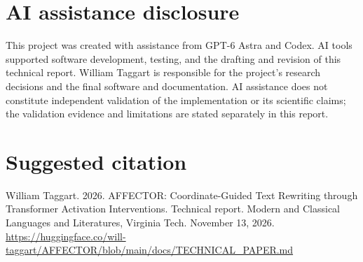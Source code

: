 \documentclass[manuscript,screen,nonacm]{acmart}
\begin{document}
\section*{AI assistance disclosure}
This project was created with assistance from GPT-6 Astra and Codex. AI
tools supported software development, testing, and the drafting and
revision of this technical report. William Taggart is responsible for
the project's research decisions and the final software and
documentation. AI assistance does not constitute independent validation
of the implementation or its scientific claims; the validation evidence
and limitations are stated separately in this report.




\section*{Suggested citation}
William Taggart. 2026. AFFECTOR: Coordinate-Guided Text Rewriting
through Transformer Activation Interventions. Technical report. Modern
and Classical Languages and Literatures, Virginia Tech. November 13, 2026.
\url{https://huggingface.co/will-taggart/AFFECTOR/blob/main/docs/TECHNICAL_PAPER.md}
\end{document}
